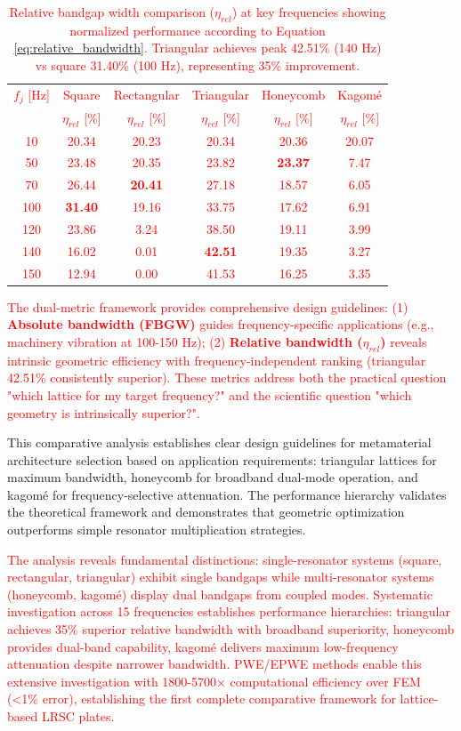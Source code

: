 \documentclass[review,numbers,sort&compress]{elsarticle}
\begin{document}
{\begin{table}[htb]
\centering
\caption{\textcolor{red}{Relative bandgap width comparison ($\eta_{rel}$) at key frequencies showing normalized performance according to Equation \ref{eq:relative_bandwidth}. Triangular achieves peak 42.51\% (140 Hz) vs square 31.40\% (100 Hz), representing 35\% improvement.}}
\label{tab:relative_bandwidth_comparison}
\textcolor{red}{
\footnotesize
\begin{tabular}{cccccc}
\hline
$f_j$ [Hz] & Square & Rectangular & Triangular & Honeycomb & Kagomé \\
& $\eta_{rel}$ [\%] & $\eta_{rel}$ [\%] & $\eta_{rel}$ [\%] & $\eta_{rel}$ [\%] & $\eta_{rel}$ [\%] \\
\hline
10 & 20.34 & 20.23 & 20.34 & 20.36 & 20.07 \\
50 & 23.48 & 20.35 & 23.82 & \textbf{23.37} & 7.47 \\
70 & 26.44 & \textbf{20.41} & 27.18 & 18.57 & 6.05 \\
100 & \textbf{31.40} & 19.16 & 33.75 & 17.62 & 6.91 \\
120 & 23.86 & 3.24 & 38.50 & 19.11 & 3.99 \\
140 & 16.02 & 0.01 & \textbf{42.51} & 19.35 & 3.27 \\
150 & 12.94 & 0.00 & 41.53 & 16.25 & 3.35 \\
\hline
\end{tabular}
}
\end{table}

\textcolor{red}{The dual-metric framework provides comprehensive design guidelines: (1) \textbf{Absolute bandwidth (FBGW)} guides frequency-specific applications (e.g., machinery vibration at 100-150 Hz); (2) \textbf{Relative bandwidth ($\eta_{rel}$)} reveals intrinsic geometric efficiency with frequency-independent ranking (triangular 42.51\% consistently superior). These metrics address both the practical question "which lattice for my target frequency?" and the scientific question "which geometry is intrinsically superior?".}

This comparative analysis establishes clear design guidelines for metamaterial architecture selection based on application requirements: triangular lattices for maximum bandwidth, honeycomb for broadband dual-mode operation, and kagomé for frequency-selective attenuation. The performance hierarchy validates the theoretical framework and demonstrates that geometric optimization outperforms simple resonator multiplication strategies.

\textcolor{red}{The analysis reveals fundamental distinctions: single-resonator systems (square, rectangular, triangular) exhibit single bandgaps while multi-resonator systems (honeycomb, kagomé) display dual bandgaps from coupled modes. Systematic investigation across 15 frequencies establishes performance hierarchies: triangular achieves 35\% superior relative bandwidth with broadband superiority, honeycomb provides dual-band capability, kagomé delivers maximum low-frequency attenuation despite narrower bandwidth. PWE/EPWE methods enable this extensive investigation with 1800-5700× computational efficiency over FEM (<1\% error), establishing the first complete comparative framework for lattice-based LRSC plates.}
 
}
\end{document}
